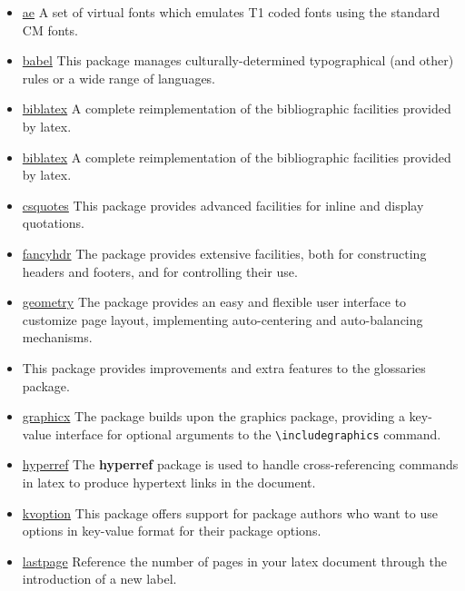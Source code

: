 \documentclass[a4paper, 11pt]{article}
\begin{document}
\begin{itemize}
    \item \href{https://www.ctan.org/pkg/ae}{ae} A set of virtual fonts which emulates T1 coded fonts using the standard CM fonts.
    \item \href{https://www.ctan.org/pkg/babel}{babel} This package manages culturally-determined typographical (and other) rules
          or a wide range of languages.
    \item \href{https://www.ctan.org/pkg/biblatex}{biblatex} A complete reimplementation of the bibliographic facilities provided by \gls{latex}.
    \item \href{https://www.ctan.org/pkg/biblatex}{biblatex} A complete reimplementation of the bibliographic facilities provided by \gls{latex}.
    \item \href{https://www.ctan.org/pkg/csquotes}{csquotes} This package provides advanced facilities for inline and display quotations.
    \item \href{https://www.ctan.org/pkg/fancyhdr}{fancyhdr} The package provides extensive facilities, both for constructing headers
          and footers, and for controlling their use.
    \item \href{https://www.ctan.org/pkg/geometry}{geometry} The package provides an easy and flexible user interface to customize
          page layout, implementing auto-centering and auto-balancing mechanisms.
    \item \href{https://www.ctan.org/pkg/glossaries}{} This package provides improvements and extra features
          to the glossaries package.
    \item \href{https://www.ctan.org/pkg/graphicx}{graphicx} The package builds upon the graphics package, providing a key-value
          interface for optional arguments to the \verb=\includegraphics= command.
    \item \href{https://www.ctan.org/pkg/hyperref}{hyperref} The \textbf{hyperref} package is used to handle cross-referencing commands in
          \gls{latex} to produce hypertext links in the document.
    \item \href{https://www.ctan.org/pkg/kvoptions}{kvoption} This package offers support for package authors who want to use options
          in key-value format for their package options.
    \item \href{https://www.ctan.org/pkg/lastpage}{lastpage} Reference the number of pages in your \gls{latex} document through the
          introduction of a new label.

\end{itemize}
\end{document}

